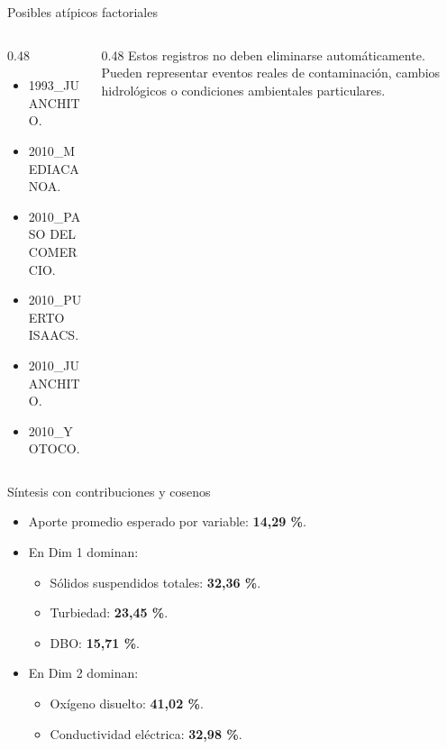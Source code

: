 \documentclass[aspectratio=169,11pt]{beamer}
\begin{document}
\begin{frame}{Posibles atípicos factoriales}
  \begin{columns}[T]
    \begin{column}{0.48\textwidth}
      \begin{itemize}
        \item 1993\_JUANCHITO.
        \item 2010\_MEDIACANOA.
        \item 2010\_PASO DEL COMERCIO.
        \item 2010\_PUERTO ISAACS.
        \item 2010\_JUANCHITO.
        \item 2010\_YOTOCO.
      \end{itemize}
    \end{column}
    \begin{column}{0.48\textwidth}
      \small
      Estos registros no deben eliminarse automáticamente. Pueden representar eventos reales de contaminación, cambios hidrológicos o condiciones ambientales particulares.
    \end{column}
  \end{columns}
\end{frame}

\begin{frame}{Síntesis con contribuciones y cosenos}
  \begin{itemize}
    \item Aporte promedio esperado por variable: \textbf{14,29 \%}.
    \item En Dim 1 dominan:
      \begin{itemize}
        \item Sólidos suspendidos totales: \textbf{32,36 \%}.
        \item Turbiedad: \textbf{23,45 \%}.
        \item DBO: \textbf{15,71 \%}.
      \end{itemize}
    \item En Dim 2 dominan:
      \begin{itemize}
        \item Oxígeno disuelto: \textbf{41,02 \%}.
        \item Conductividad eléctrica: \textbf{32,98 \%}.
      \end{itemize}
  \end{itemize}
\end{frame}
\end{document}
